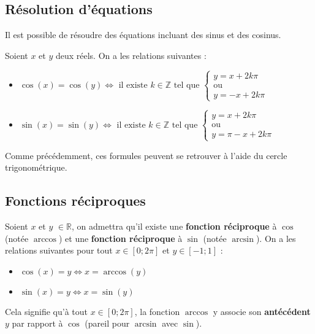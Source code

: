	\subsection{Résolution d'équations}

	Il est possible de résoudre des équations incluant des sinus et des cosinus.

	\begin{formula}
		Soient $x$ et $y$ deux réels. On a les relations suivantes :
		\begin{itemize}
			\item $\cos(x) = \cos(y) \iff \text{ il existe } k \in \mathbb{Z} \text{ tel que } \begin{cases} y = x + 2k\pi \\ \text{ou} \\ y = -x + 2k\pi\end{cases}$
			\item $\sin(x) = \sin(y) \iff \text{ il existe } k \in \mathbb{Z} \text{ tel que } \begin{cases} y = x + 2k\pi \\ \text{ou} \\ y = \pi - x + 2k\pi\end{cases}$
		\end{itemize}
	\end{formula}

	Comme précédemment, ces formules peuvent se retrouver à l'aide du cercle trigonométrique.

	\subsection{Fonctions réciproques}

	\begin{formula}[Définition]
		Soient $x$ et $y$ $\in \mathbb{R}$, on admettra qu'il existe une \textbf{fonction réciproque} à $\cos$ (notée $\arccos$) et une \textbf{fonction réciproque} à $\sin$ (notée $\arcsin$). On a les relations suivantes pour tout $x \in [0; 2\pi]$ et $y \in [-1; 1]$ :
		\begin{itemize}
			\item $\cos(x) = y \iff x = \arccos(y)$
			\item $\sin(x) = y \iff x = \sin(y)$
		\end{itemize}
	\end{formula}

	Cela signifie qu'à tout $x \in [0; 2\pi]$, la fonction $\arccos$ y associe son \textbf{antécédent} $y$ par rapport à $\cos$ (pareil pour $\arcsin$ avec $\sin$).

